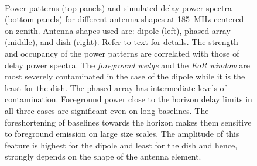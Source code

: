 \documentclass[preprint2,iop,numberedappendix]{emulateapj}
\begin{document}
\begin{figure}[htb]
\centering
{} \\
\caption{Power patterns (top panels) and simulated delay power spectra (bottom panels) for different antenna shapes at 185~MHz centered on zenith. Antenna shapes used are: dipole (left), phased array (middle), and dish (right). Refer to text for details. The strength and occupancy of the power patterns are correlated with those of delay power spectra. The {\it foreground wedge} and the {\it EoR window} are most severely contaminated in the case of the dipole while it is the least for the dish. The phased array has intermediate levels of contamination. Foreground power close to the horizon delay limits in all three cases are significant even on long baselines. The foreshortening of baselines towards the horizon makes them sensitive to foreground emission on large size scales. The amplitude of this feature is highest for the dipole and least for the dish and hence, strongly depends on the shape of the antenna element.}
\label{fig:aperture-shapes}
\end{figure}
\end{document}
